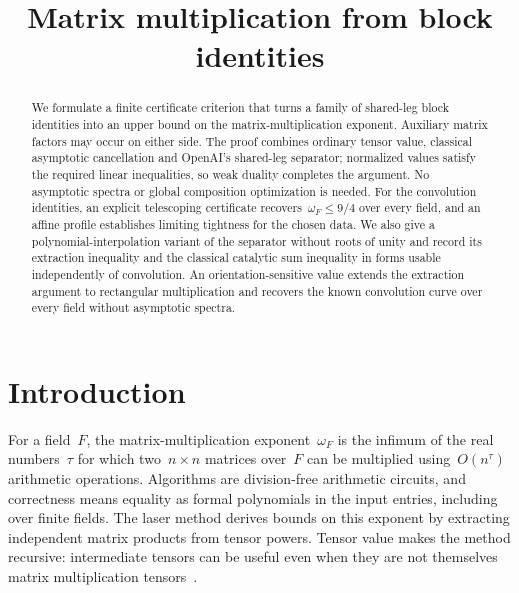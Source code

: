 \documentclass[11pt,letterpaper]{article}
\title{Matrix multiplication from block identities}
\author{}
\date{}
\theoremstyle{definition}
\numberwithin{equation}{section}
\begin{document}
\maketitle
\begin{abstract}
We formulate a finite certificate criterion that turns a family of shared-leg block identities into an upper bound on the matrix-multiplication exponent. Auxiliary matrix factors may occur on either side. The proof combines ordinary tensor value, classical asymptotic cancellation and OpenAI's shared-leg separator; normalized values satisfy the required linear inequalities, so weak duality completes the argument. No asymptotic spectra or global composition optimization is needed. For the convolution identities, an explicit telescoping certificate recovers~$\omega_F\leq9/4$ over every field, and an affine profile establishes limiting tightness for the chosen data. We also give a polynomial-interpolation variant of the separator without roots of unity and record its extraction inequality and the classical catalytic sum inequality in forms usable independently of convolution. An orientation-sensitive value extends the extraction argument to rectangular multiplication and recovers the known convolution curve over every field without asymptotic spectra.
\end{abstract}

\section{Introduction}

For a field~$F$, the matrix-multiplication exponent~$\omega_F$ is the infimum of the real numbers~$\tau$ for which two~$n\times n$ matrices over~$F$ can be multiplied using~$O(n^\tau)$ arithmetic operations. Algorithms are division-free arithmetic circuits, and correctness means equality as formal polynomials in the input entries, including over finite fields. The laser method derives bounds on this exponent by extracting independent matrix products from tensor powers. Tensor value makes the method recursive: intermediate tensors can be useful even when they are not themselves matrix multiplication tensors~\cite{Str87,CW90,DS13,VW12,LG14}.
\end{document}
